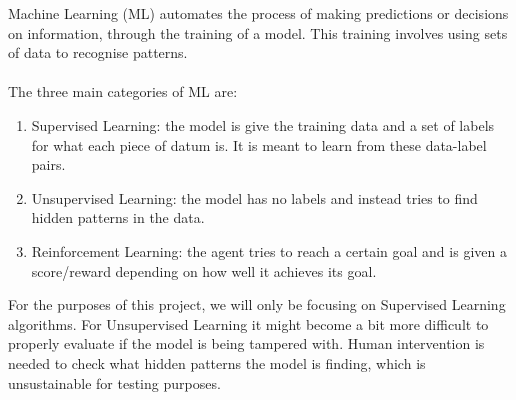 Machine Learning (ML) automates the process of making predictions or decisions on information, through the training of a model. 
This training involves using sets of data to recognise patterns.
\\ \\
The three main categories of ML are:
\begin{enumerate}
    \item Supervised Learning: the model is give the training data and a set of labels for what each piece of datum is. It is meant to learn from these data-label pairs.
    
    \item Unsupervised Learning: the model has no labels and instead tries to find hidden patterns in the data.
    
    \item Reinforcement Learning: the agent tries to reach a certain goal and is given a score/reward depending on how well it achieves its goal.
\end{enumerate}
For the purposes of this project, we will only be focusing on Supervised Learning algorithms. 
For Unsupervised Learning it might become a bit more difficult to properly evaluate if the model is being tampered with. 
Human intervention is needed to check what hidden patterns the model is finding, which is unsustainable for testing purposes.


